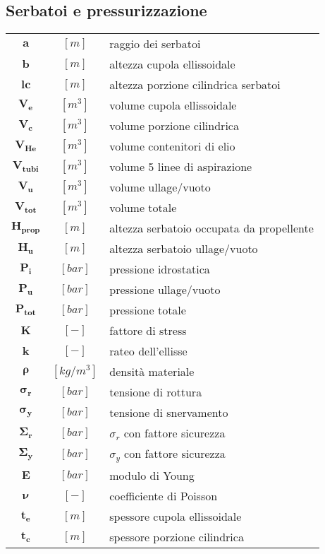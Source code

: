 \begin{multicols}{2}
	\subsection{Serbatoi e pressurizzazione}
	\begin{tabularx}{\linewidth}{cc>{\raggedright\arraybackslash}X}
		$\bm{a}$ & $[m]$ & raggio dei serbatoi \\
		$\bm{b}$ & $[m]$ & altezza cupola ellissoidale \\
		$\bm{lc}$ & $[m]$ & altezza porzione cilindrica serbatoi \\
		$\bm{V_{e}}$ & $[m^3]$ & volume cupola ellissoidale \\
	    $\bm{V_{c}}$ & $[m^3]$ & volume porzione cilindrica \\
	    $\bm{V_{He}}$ & $[m^3]$ & volume contenitori di elio \\	
     	$\bm{V_{tubi}}$ & $[m^3]$ & volume 5 linee di aspirazione \\		
        $\bm{V_{u}}$ & $[m^3]$ & volume ullage/vuoto \\
	    $\bm{V_{tot}}$ & $[m^3]$ & volume totale \\
	    $\bm{H_{prop}}$ & $[m]$ & altezza serbatoio occupata da propellente\\
		$\bm{H_{u}}$ & $[m]$ & altezza serbatoio ullage/vuoto \\
	    $\bm{P_{i}}$ & $[bar]$ & pressione idrostatica  \\
	    $\bm{P_{u}}$ & $[bar]$ & pressione ullage/vuoto \\
		$\bm{P_{tot}}$ & $[bar]$ & pressione totale \\
	    $\bm{K }$ & $[-]$ & fattore di stress \\
	    $\bm{k}$ & $[-]$ & rateo dell'ellisse \\
	    $\bm{\rho}$ & $[kg/m^3]$ & densità materiale \\
	    $\bm{\sigma_{r}}$ & $[bar]$ & tensione di rottura \\
		$\bm{\sigma_{y}}$ & $[bar]$ & tensione di snervamento \\
	    $\bm{\Sigma_{r}}$ & $[bar]$ & $\sigma_{r}$ con fattore sicurezza\\
	    $\bm{\Sigma_{y}}$ & $[bar]$ & $\sigma_{y}$ con fattore sicurezza \\
        $\bm{E}$ & $[bar]$ & modulo di Young \\
		$\bm{\nu}$ & $[-]$ & coefficiente di Poisson \\
		$\bm{t_{e}}$ & $[m]$ & spessore cupola ellissoidale \\
		$\bm{t_{c}}$ & $[m]$ & spessore porzione cilindrica 
	\end{tabularx}


\end{multicols}
